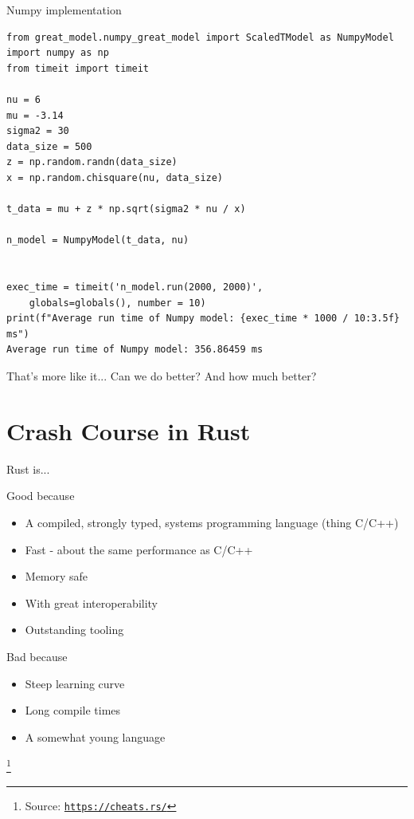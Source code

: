 \documentclass[8pt]{beamer}
\newcommand\blfootnote[1]{%
	\begingroup
	\renewcommand\thefootnote{}\footnote{#1}%
	\addtocounter{footnote}{-1}%
	\endgroup
}
\begin{document}
\begin{frame}[fragile]{Numpy implementation}
\begin{verbatim}
from great_model.numpy_great_model import ScaledTModel as NumpyModel
import numpy as np
from timeit import timeit

nu = 6
mu = -3.14
sigma2 = 30
data_size = 500
z = np.random.randn(data_size)
x = np.random.chisquare(nu, data_size)

t_data = mu + z * np.sqrt(sigma2 * nu / x)

n_model = NumpyModel(t_data, nu)


exec_time = timeit('n_model.run(2000, 2000)', 
	globals=globals(), number = 10)
print(f"Average run time of Numpy model: {exec_time * 1000 / 10:3.5f} ms")
Average run time of Numpy model: 356.86459 ms
\end{verbatim}
That's more like it... Can we do better? And how much better?  
\end{frame}

\section{Crash Course in Rust}
\begin{frame}{Rust is...}
\begin{block}{Good because}
	\begin{itemize}
	\item A compiled, strongly typed, systems programming language (thing C/C++)
	\item Fast - about the same performance as C/C++
	\item Memory safe
	\item With great interoperability
	\item Outstanding tooling
	\end{itemize}
\end{block}

\pause
\begin{block}{Bad because }
	\begin{itemize}
	\item Steep learning curve
	\item Long compile times
	\item A somewhat young language
	\end{itemize}
\end{block}

\blfootnote{Source: \texttt{\url{https://cheats.rs/}}}
\end{frame}
\end{document}
